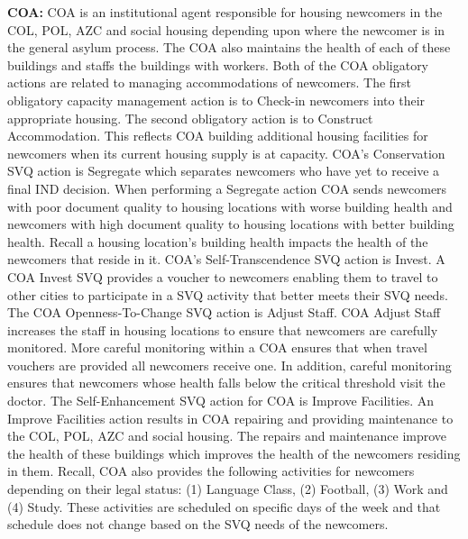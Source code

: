 \documentclass{scspaperproc}
\theoremstyle{scsthe}
\begin{document}
{\bf COA:} COA is an institutional agent responsible for housing newcomers in the COL, POL, AZC and social housing depending upon where the newcomer is in the general asylum process. The COA also maintains the health of each of these buildings and staffs the buildings with workers. Both of the COA obligatory actions are related to managing accommodations of newcomers. The first obligatory capacity management action is to Check-in newcomers into their appropriate housing. The second obligatory action is to Construct Accommodation. This reflects COA building additional housing facilities for newcomers when its current housing supply is at capacity. COA's Conservation SVQ action is Segregate which separates newcomers who have yet to receive a final IND decision. When performing a Segregate action COA sends newcomers with poor document quality to housing locations with worse building health and newcomers with high document quality to housing locations with better building health. Recall a housing location's building health impacts the health of the newcomers that reside in it. COA's Self-Transcendence SVQ action is Invest. A COA Invest SVQ provides a voucher to newcomers enabling them to travel to other cities to participate in a SVQ activity that better meets their SVQ needs. The COA Openness-To-Change SVQ action is Adjust Staff. COA Adjust Staff increases the staff in housing locations to ensure that newcomers are carefully monitored. More careful monitoring within a COA ensures that when travel vouchers are provided all newcomers receive one. In addition, careful monitoring ensures that newcomers whose health falls below the critical threshold visit the doctor. The Self-Enhancement SVQ action for COA is Improve Facilities.  An Improve Facilities action results in COA repairing and providing maintenance to the COL, POL, AZC and social housing. The repairs and maintenance improve the health of these buildings which improves the health of the newcomers residing in them. Recall, COA also provides the following activities for newcomers depending on their legal status: (1) Language Class, (2) Football, (3) Work and (4) Study. These activities are scheduled on specific days of the week and that schedule does not change based on the SVQ needs of the newcomers.
\end{document}
